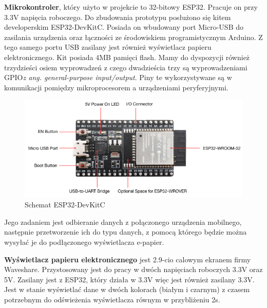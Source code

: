 \documentclass[a4paper,12pt, twoside]{article}
\begin{document}
    	\textbf{Mikrokontroler}, który użyto w projekcie to 32-bitowy ESP32. Pracuje on przy 3.3V napięcia roboczego. Do zbudowania prototypu posłużono się kitem developerskim ESP32-DevKitC. Posiada on wbudowany port Micro-USB do zasilania urządzenia oraz łączności ze środowiskiem programistycznym Arduino. Z tego samego portu USB zasilany jest również wyświetlacz papieru elektronicznego. Kit posiada 4MB pamięci flash\cite{flash}. Mamy do dyspozycji również trzydzieści osiem wyprowadzeń z czego dwadzieścia trzy są wyprowadzeniami GPIO\textit{z ang. general-purpose input/output}. Piny te wykorzystywane są w komunikacji pomiędzy mikroprocesorem a urządzeniami peryferyjnymi.
    	\vspace{.5cm}
    	\begin{figure}[H]
    	        \centering
    			\vspace{.5cm}
    			\includegraphics[width=14cm]{images/rys8_devkit.png}
    			\vspace{.5cm}
    			\caption{Schemat ESP32-DevKitC\cite{devkit}}
                \label{fig:devkit}
    	\end{figure}
    	\vspace{.5cm}
    	Jego zadaniem jest odbieranie danych z połączonego urządzenia mobilnego, następnie przetworzenie ich do typu danych, z pomocą którego będzie można wysyłać je do podłączonego wyświetlacza e-papier.
    	
    	\vspace{1cm}
    
        \textbf{Wyświetlacz papieru elektronicznego} jest 2.9-cio calowym ekranem firmy Waveshare. Przystosowany jest do pracy w dwóch napięciach roboczych 3.3V oraz 5V. Zasilany jest z ESP32, który działa w 3.3V więc jest również zasilany 3.3V. Jest w stanie wyświetlać dane w dwóch kolorach (białym i czarnym) z czasem potrzebnym do odświeżenia wyświetlacza równym w przybliżeniu 2s\cite{waveshare}.
        
\end{document}
